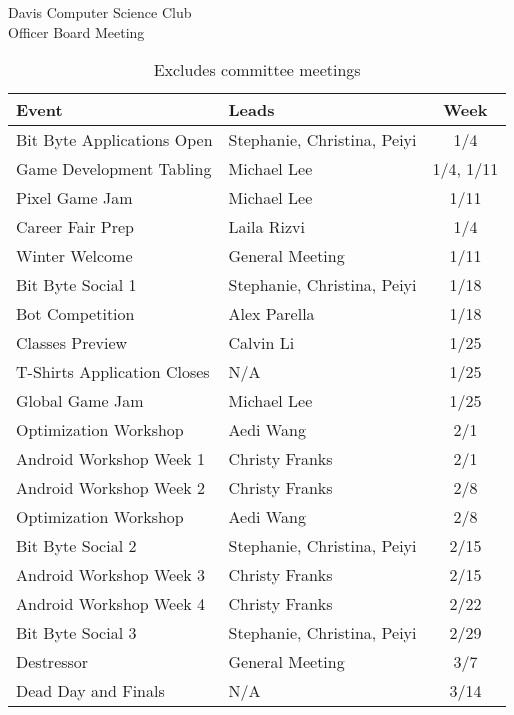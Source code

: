 \documentclass{article}
\begin{document}
\begin{Minutes}{Davis Computer Science Club\\Officer Board Meeting}
\begin{table}[h]
	\centering
	\renewcommand*{\arraystretch}{1.5}
	\begin{tabular}{l l c}
		Event
			&	Leads
			&	Week\\
		\hline
		Bit Byte Applications Open
		    &   Stephanie, Christina, Peiyi
		    &   1/4\\
		Game Development Tabling 
		    &   Michael Lee
		    &   1/4, 1/11\\
		Pixel Game Jam
		    &   Michael Lee
		    &   1/11\\
		Career Fair Prep
			&   Laila Rizvi
			&   1/4\\
		Winter Welcome 
			&   General Meeting
			&   1/11\\
		Bit Byte Social 1
		    &   Stephanie, Christina, Peiyi
		    &   1/18\\
		Bot Competition
			&   Alex Parella
			&   1/18\\
		Classes Preview
		    &   Calvin Li
		    &   1/25\\
		T-Shirts Application Closes
		    &   N/A
		    &   1/25\\
	    Global Game Jam
	        &   Michael Lee
	        &   1/25\\
		Optimization Workshop
		    &   Aedi Wang
		    &   2/1\\
		Android Workshop Week 1
			&   Christy Franks
			&   2/1\\
		Android Workshop Week 2
			&   Christy Franks
			&   2/8\\
        Optimization Workshop
		    &   Aedi Wang
		    &   2/8\\
	    Bit Byte Social 2
		    &   Stephanie, Christina, Peiyi
		    &   2/15\\
		Android Workshop Week 3
			&	Christy Franks
			&	2/15\\
		Android Workshop Week 4
			&   Christy Franks
			&   2/22\\
		Bit Byte Social 3
			&	Stephanie, Christina, Peiyi
			&	2/29\\
		Destressor
		    &   General Meeting
		    &   3/7\\
		Dead Day and Finals
		    &   N/A
		    &   3/14\\
		
	\end{tabular}
	\caption*{Excludes committee meetings}
\end{table}

\end{Minutes}
\thispagestyle{creditfooter}
\end{document}

